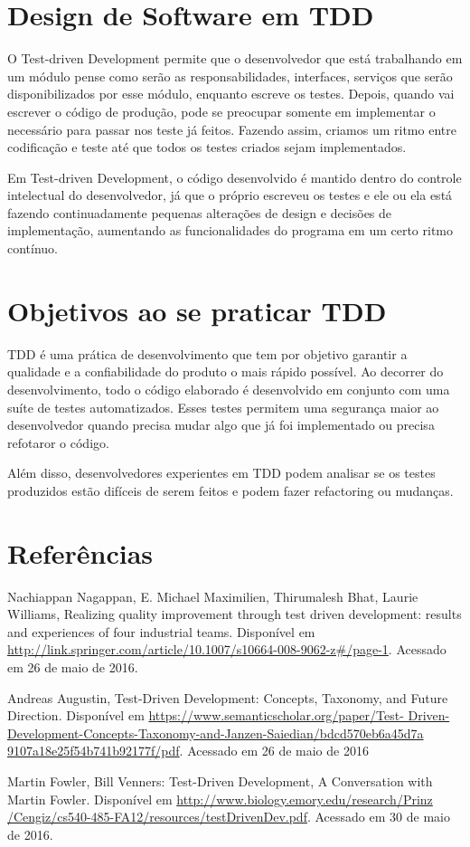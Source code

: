 \documentclass{article}
\begin{document}
  \section{Design de Software em TDD}

  O Test-driven Development permite que o desenvolvedor que está trabalhando 
  em um módulo pense como serão as responsabilidades, interfaces, serviços que serão
  disponibilizados por esse módulo, enquanto escreve os testes. Depois,
  quando vai escrever o código de produção, pode se preocupar somente em implementar
  o necessário para passar nos teste já feitos. Fazendo assim, 
  criamos um ritmo entre codificação e teste até que todos os testes criados sejam 
  implementados.

  Em Test-driven Development, o código desenvolvido é mantido dentro do controle
  intelectual do desenvolvedor, já que o próprio escreveu os testes e ele ou 
  ela está fazendo continuadamente pequenas alterações de design e decisões de 
  implementação, aumentando as funcionalidades do programa em um certo ritmo 
  contínuo.

  \section{Objetivos ao se praticar TDD}

  TDD é uma prática de desenvolvimento que tem por objetivo garantir a
  qualidade e a confiabilidade do produto o mais rápido possível. Ao decorrer do
  desenvolvimento, todo o código elaborado é desenvolvido em conjunto com uma
  suíte de testes automatizados. Esses testes permitem uma segurança maior ao
  desenvolvedor quando precisa mudar algo que já foi implementado ou precisa 
  refotaror o código.

  Além disso, desenvolvedores experientes em TDD podem analisar se os testes 
  produzidos estão difíceis de serem feitos e podem fazer refactoring ou 
  mudanças.

  \section{Referências}

  Nachiappan Nagappan, E. Michael Maximilien, Thirumalesh Bhat,
  Laurie Williams, Realizing quality improvement through test driven 
  development: results and experiences of four industrial teams. Disponível em
  \url{http://link.springer.com/article/10.1007/s10664-008-9062-z#/page-1}.
  Acessado em 26 de maio de 2016.

  Andreas Augustin, Test-Driven Development: Concepts, Taxonomy, and Future 
  Direction. Disponível em \url{https://www.semanticscholar.org/paper/Test-
  Driven-Development-Concepts-Taxonomy-and-Janzen-Saiedian/bdcd570eb6a45d7a
  9107a18e25f54b741b92177f/pdf}. Acessado em 26 de maio de 2016

  Martin Fowler, Bill Venners: Test-Driven Development, A Conversation with 
  Martin Fowler. Disponível em \url{http://www.biology.emory.edu/research/Prinz
  /Cengiz/cs540-485-FA12/resources/testDrivenDev.pdf}. Acessado em 30 de maio de
  2016.
\end{document}
